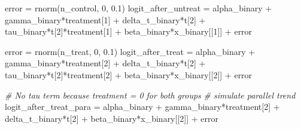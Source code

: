 \documentclass[
]{article}
\newenvironment{Shaded}{\begin{snugshade}}{\end{snugshade}}
\newcommand{\CommentTok}[1]{\textcolor[rgb]{0.56,0.35,0.01}{\textit{#1}}}
\newcommand{\DecValTok}[1]{\textcolor[rgb]{0.00,0.00,0.81}{#1}}
\newcommand{\FloatTok}[1]{\textcolor[rgb]{0.00,0.00,0.81}{#1}}
\newcommand{\FunctionTok}[1]{\textcolor[rgb]{0.00,0.00,0.00}{#1}}
\newcommand{\NormalTok}[1]{#1}
\newcommand{\OtherTok}[1]{\textcolor[rgb]{0.56,0.35,0.01}{#1}}
\newcommand{\SpecialCharTok}[1]{\textcolor[rgb]{0.00,0.00,0.00}{#1}}
\begin{document}
\begin{Shaded}
\begin{Highlighting}[]
\NormalTok{error }\OtherTok{=} \FunctionTok{rnorm}\NormalTok{(n\_control, }\DecValTok{0}\NormalTok{, }\FloatTok{0.1}\NormalTok{)}
\NormalTok{logit\_after\_untreat }\OtherTok{=}\NormalTok{ alpha\_binary }\SpecialCharTok{+}\NormalTok{ gamma\_binary}\SpecialCharTok{*}\NormalTok{treatment[}\DecValTok{1}\NormalTok{] }\SpecialCharTok{+}\NormalTok{ delta\_t\_binary}\SpecialCharTok{*}\NormalTok{t[}\DecValTok{2}\NormalTok{] }\SpecialCharTok{+} 
\NormalTok{  tau\_binary}\SpecialCharTok{*}\NormalTok{t[}\DecValTok{2}\NormalTok{]}\SpecialCharTok{*}\NormalTok{treatment[}\DecValTok{1}\NormalTok{] }\SpecialCharTok{+}\NormalTok{ beta\_binary}\SpecialCharTok{*}\NormalTok{x\_binary[[}\DecValTok{1}\NormalTok{]] }\SpecialCharTok{+}\NormalTok{ error}

\NormalTok{error }\OtherTok{=} \FunctionTok{rnorm}\NormalTok{(n\_treat, }\DecValTok{0}\NormalTok{, }\FloatTok{0.1}\NormalTok{)}
\NormalTok{logit\_after\_treat }\OtherTok{=}\NormalTok{ alpha\_binary }\SpecialCharTok{+}\NormalTok{ gamma\_binary}\SpecialCharTok{*}\NormalTok{treatment[}\DecValTok{2}\NormalTok{] }\SpecialCharTok{+}\NormalTok{ delta\_t\_binary}\SpecialCharTok{*}\NormalTok{t[}\DecValTok{2}\NormalTok{] }\SpecialCharTok{+} 
\NormalTok{  tau\_binary}\SpecialCharTok{*}\NormalTok{t[}\DecValTok{2}\NormalTok{]}\SpecialCharTok{*}\NormalTok{treatment[}\DecValTok{2}\NormalTok{] }\SpecialCharTok{+}\NormalTok{ beta\_binary}\SpecialCharTok{*}\NormalTok{x\_binary[[}\DecValTok{2}\NormalTok{]] }\SpecialCharTok{+}\NormalTok{ error}

\CommentTok{\# No tau term because treatment = 0 for both groups}
\CommentTok{\# simulate parallel trend}
\NormalTok{logit\_after\_treat\_para }\OtherTok{=}\NormalTok{ alpha\_binary }\SpecialCharTok{+}\NormalTok{ gamma\_binary}\SpecialCharTok{*}\NormalTok{treatment[}\DecValTok{2}\NormalTok{] }\SpecialCharTok{+}\NormalTok{ delta\_t\_binary}\SpecialCharTok{*}\NormalTok{t[}\DecValTok{2}\NormalTok{] }\SpecialCharTok{+}
\NormalTok{  beta\_binary}\SpecialCharTok{*}\NormalTok{x\_binary[[}\DecValTok{2}\NormalTok{]] }\SpecialCharTok{+}\NormalTok{ error}
\end{Highlighting}
\end{Shaded}
\end{document}
